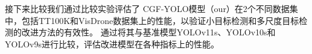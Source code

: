 


接下来比较我们通过比较实验评估了 CGF-YOLO模型（our）在2个不同数据集中，包括TT100K和VisDrone数据集上的性能，以验证小目标检测和多尺度目标检测的改进方法的有效性。
通过将其与基准模型YOLOv11s、YOLOv10s和YOLOv9s进行比较，评估改进模型在各种指标上的性能。

